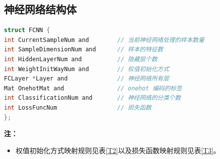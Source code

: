 \documentclass[UTF-8]{progbookcn}
\begin{document}
\begin{table}[!ht]
\centering
\caption{激活函数映射规则}
\label{T1}
\end{table}




\subsection{神经网络结构体}

\begin{lstlisting}[language=C,caption={神经网络结构体}]
struct FCNN {
int CurrentSampleNum and        // 当前神经网络处理的样本数量
int SampleDimensionNum and      // 样本的特征数
int HiddenLayerNum and          // 隐藏层个数
int WeightInitWayNum and        // 权值初始化方式
FCLayer *Layer and              // 神经网络所有层
Mat OnehotMat and               // onehot 编码的标签
int ClassificationNum and       // 神经网络的分类个数
int LossFuncNum                 // 损失函数
};
\end{lstlisting}

\noindent\textbf{注：}
\begin{itemize}
  \item 权值初始化方式映射规则见表\ref{T2}以及损失函数映射规则见表\ref{T3}。
\end{itemize}
\end{document}
